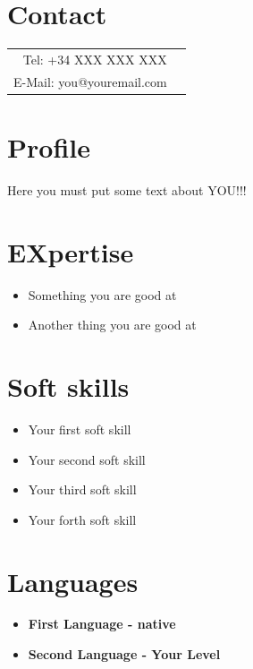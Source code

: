 \documentclass[11pt, oneside, a4paper,titlepage]{article}
\begin{document}
\begin{tcolorbox}
  \begin{minipage}[t]{8cm}
    \vspace*{-0.5cm}
    \begin{tcolorbox}[grow to left by=0.6cm,colback=Lblanco,colframe=Lblanco]
      \section*{Contact}
      \begin{tabular}{r l}
        Tel: +34 XXX XXX XXX \\
        E-Mail: you@youremail.com \\
      \end{tabular}
      \section*{Profile}
        Here you must put some text about YOU!!! 
      \section*{EXpertise}
      \begin{itemize}
        \item{Something you are good at} 
        \item{Another thing you are good at}
      \end{itemize}
      \section*{Soft skills}
      \begin{itemize}
        \item{Your first soft skill}
        \item{Your second soft skill}
        \item{Your third soft skill}
        \item{Your forth soft skill}
      \end{itemize}
      \section*{Languages}
      \begin{itemize}
        \item{\textbf{First Language - native}} 
        \item{\textbf{Second Language - Your Level}}
      \end{itemize}


\end{tcolorbox}
\end{minipage}
\end{tcolorbox}
\end{document}
